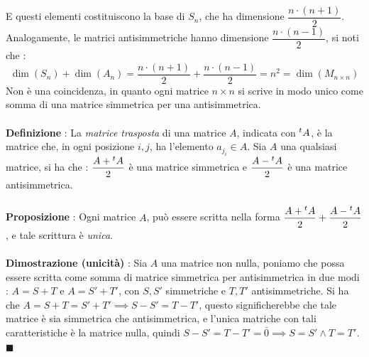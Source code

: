 \documentclass[12pt, letterpaper]{article}
\newcommand{\acc}{\\\hphantom{}\\}
\begin{document}
E questi elementi costituiscono la base di \(S_n\), che ha dimensione \(\dfrac{n\cdot(n+1)}{2}\). Analogamente, 
le matrici antisimmetriche hanno dimensione  \(\dfrac{n\cdot(n-1)}{2}\), si noti che : \begin{equation}
    \dim(S_n)+\dim(A_n)=\dfrac{n\cdot(n+1)}{2}+\dfrac{n\cdot(n-1)}{2}=n^2=\dim(M_{n\times n})
\end{equation}
Non è una coincidenza, in quanto ogni matrice \(n\times n\) si scrive in modo unico come somma di una 
matrice simmetrica per una antisimmetrica.\acc 
\textbf{Definizione }: La \textit{matrice trasposta} di una matrice \(A\), indicata con \(\text{\hphantom{}}^tA\), è 
la matrice che, in ogni posizione \(i,j\), ha l'elemento \(a_{j_i}\in A\). Sia \(A\) una qualsiasi matrice, 
si ha che : \(\dfrac{A+\text{\hphantom{}}^tA}{2}\) è una matrice simmetrica e \(\dfrac{A-\text{\hphantom{}}^tA}{2}\)
è una matrice antisimmetrica.\acc  
\textbf{Proposizione} : Ogni matrice \(A\), può essere scritta nella forma \(\dfrac{A+\text{\hphantom{}}^tA}{2}+\dfrac{A-\text{\hphantom{}}^tA}{2}\), e 
tale scrittura è \textit{unica}.\acc 
\textbf{Dimostrazione (unicità)} : Sia \(A\) una matrice non nulla, poniamo che possa essere 
scritta come somma di matrice simmetrica per antisimmetrica in due modi : \(A=S+T\) e \(A=S'+T'\), con 
\(S,S'\) simmetriche e \(T,T'\) antisimmetriche. Si ha che \(A=S+T=S'+T'\implies S-S'=T-T'\), questo significherebbe 
che tale matrice è sia simmetrica  che antisimmetrica, e l'unica matriche con tali caratteristiche è la 
matrice nulla, quindi \(S-S'=T-T'=\bar 0 \implies S=S'\land T=T'\). \(\blacksquare\)  
\end{document}
